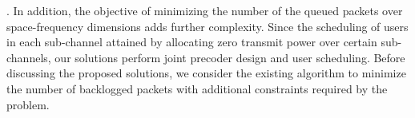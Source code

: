 
. In addition, the objective of minimizing the number of the queued packets over space-frequency dimensions adds further complexity. Since the scheduling of users in each sub-channel attained by allocating zero transmit power over certain sub-channels, our solutions perform joint precoder design and user scheduling. Before discussing the proposed solutions, we consider the existing algorithm to minimize the number of backlogged packets with additional constraints required by the problem.